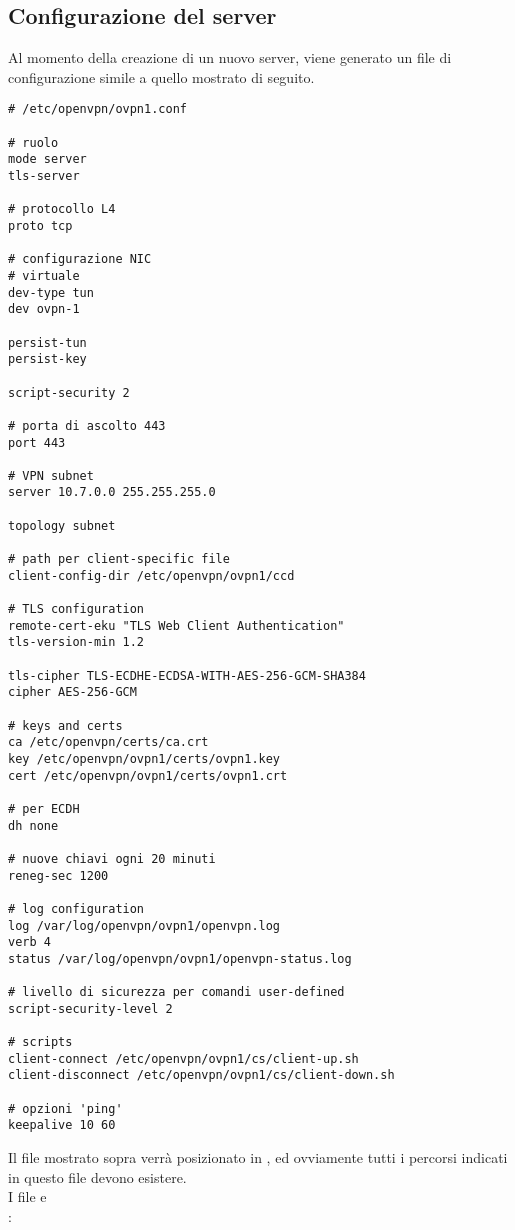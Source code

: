 \subsection{Configurazione del server}
Al momento della creazione di un nuovo server, viene generato un file di configurazione
simile a quello mostrato di seguito.
\begin{verbatim}
# /etc/openvpn/ovpn1.conf

# ruolo
mode server
tls-server

# protocollo L4
proto tcp

# configurazione NIC
# virtuale
dev-type tun
dev ovpn-1

persist-tun
persist-key

script-security 2

# porta di ascolto 443
port 443

# VPN subnet
server 10.7.0.0 255.255.255.0

topology subnet

# path per client-specific file
client-config-dir /etc/openvpn/ovpn1/ccd

# TLS configuration
remote-cert-eku "TLS Web Client Authentication"
tls-version-min 1.2

tls-cipher TLS-ECDHE-ECDSA-WITH-AES-256-GCM-SHA384
cipher AES-256-GCM

# keys and certs
ca /etc/openvpn/certs/ca.crt
key /etc/openvpn/ovpn1/certs/ovpn1.key
cert /etc/openvpn/ovpn1/certs/ovpn1.crt

# per ECDH
dh none

# nuove chiavi ogni 20 minuti
reneg-sec 1200

# log configuration
log /var/log/openvpn/ovpn1/openvpn.log
verb 4
status /var/log/openvpn/ovpn1/openvpn-status.log

# livello di sicurezza per comandi user-defined
script-security-level 2

# scripts
client-connect /etc/openvpn/ovpn1/cs/client-up.sh
client-disconnect /etc/openvpn/ovpn1/cs/client-down.sh

# opzioni 'ping'
keepalive 10 60
\end{verbatim}
Il file mostrato sopra verrà posizionato in , ed
ovviamente tutti i percorsi indicati in questo file devono esistere.\\
I file  e \\
:
